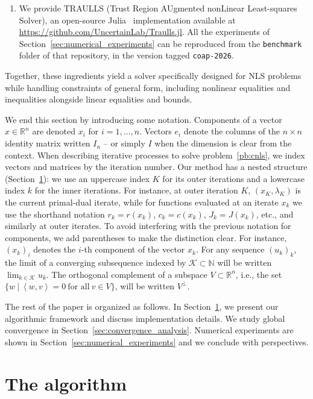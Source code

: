 \documentclass[pdflatex,sn-mathphys-num]{sn-jnl}%
\theoremstyle{thmstyleone}%
\newcommand{\RR}{{\mathbb{R}}} %
\newcommand{\NN}{{\mathbb{N}}} %
\newcommand{\calK}{{\mathcal{K}}}
\newcommand{\inner}[2]{\left\langle {#1} , {#2} \right\rangle} %
\begin{document}
\begin{enumerate}[label=(\roman*), leftmargin=*, itemsep=2pt]
	\item We provide TRAULLS (Trust Region AUgmented nonLinear Least-squares Solver), an open-source Julia~\cite{bezanson-etal:2017} implementation available at \url{https://github.com/UncertainLab/Traulls.jl}. All the experiments of Section~\ref{sec:numerical_experiments} can be reproduced from the \texttt{benchmark} folder of that repository, in the version tagged \texttt{coap-2026}.
\end{enumerate}
Together, these ingredients yield a solver specifically designed for NLS problems while handling constraints of general form, including nonlinear equalities and inequalities alongside linear equalities and bounds.

We end this section by introducing some notation. Components of a vector $x\in\RR^n$ are denoted $x_i$ for $i=1,\ldots,n$. Vectors $e_i$ denote the columns of the $n \times n$ identity matrix written $I_n$ -- or simply $I$ when the dimension is clear from the context. When describing iterative processes to solve problem~\eqref{pb:cnls}, we index vectors and matrices by the iteration number. Our method has a nested structure (Section~\ref{sec:algorithm}): we use an uppercase index $K$ for its outer iterations and a lowercase index $k$ for the inner iterations. For instance, at outer iteration $K$, $(x_K,\lambda_K)$ is the current primal-dual iterate, while for functions evaluated at an iterate $x_k$ we use the shorthand notation $r_k = r(x_k)$, $c_k =c(x_k)$, $J_k=J(x_k)$, etc., and similarly at outer iterates. To avoid interfering with the previous notation for components, we add parentheses to make the distinction clear. For instance, $(x_k)_i$ denotes the $i$-th component of the vector $x_k$. For any sequence $(u_k)_k$, the limit of a converging subsequence indexed by $\calK \subset \NN$ will be written $\lim_{k \in \calK} u_k$. The orthogonal complement of a subspace $V \subset \RR^n$, i.e., the set $\{ w\ | \ \inner{w}{v}=0\ \text{for all}\ v \in V\}$, will be written $V^\perp$.

The rest of the paper is organized as follows. In Section~\ref{sec:algorithm}, we present our algorithmic framework and discuss implementation details. We study global convergence in Section~\ref{sec:convergence_analysis}. Numerical experiments are shown in Section~\ref{sec:numerical_experiments} and we conclude with perspectives.

\section{The algorithm}\label{sec:algorithm}
\end{document}
